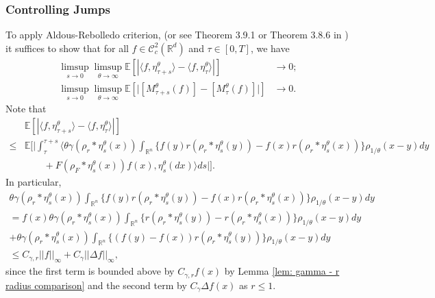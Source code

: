 \documentclass[12pt]{article}
\begin{document}
\subsubsection{Controlling Jumps}
To apply Aldous-Rebolledo criterion,
(or see Theorem 3.9.1 or Theorem 3.8.6 in \cite{EK})
it suffices to show that for all $f \in \mathcal{C}^2_{c}(\mathbb{R}^d)$
and $\tau \in [0,T]$, we have 
\begin{equation}
\begin{aligned}
\limsup_{s \to 0}\limsup_{\theta \to \infty}\mathbb{E}\left[\left| \langle f, \eta^{\theta}_{\tau+s}\rangle - \langle f, \eta^{\theta}_{\tau}\rangle \right|\right]& \to 0;\\
\limsup_{s \to 0}\limsup_{\theta \to \infty}\mathbb{E}\left[\big| [M^{\theta}_{\tau+s}(f)] - [M^{\theta}_{\tau}(f)] \big|\right]& \to 0.
\end{aligned}    
\end{equation}
Note that
\begin{equation}
\begin{aligned}
 & \mathbb{E}\left[\left| \langle f, \eta^{\theta}_{\tau+s}\rangle - \langle f, \eta^{\theta}_{\tau}\rangle \right|\right] \\
\leq & \mathbb{E}\Bigg[\bigg| \int_{\tau}^{\tau+s}\bigg\langle \theta\gamma(\rho_{r}*\eta^{\theta}_{s}(x)) \int_{\mathbb{R}^n} \big\{f(y)r(\rho_{r}*\eta^{\theta}_{s}(y))-f(x)r(\rho_{r}*\eta^{\theta}_{s}(x))\big\}\rho_{1/\theta}(x-y)dy \\
& \qquad + F(\rho_{F}*\eta^{\theta}_{s}(x)) f(x),\eta^{\theta}_{s}(dx)  \bigg\rangle ds \bigg|\Bigg].
\end{aligned}
\end{equation}
In particular,
\begin{multline}
 \theta\gamma(\rho_{r}*\eta^{\theta}_{s}(x))\int_{\mathbb{R}^n} \big\{f(y)r(\rho_{r}*\eta^{\theta}_{s}(y))-f(x)r(\rho_{r}*\eta^{\theta}_{s}(x))\big\}\rho_{1/\theta}(x-y)dy \\
 =  f(x)\theta\gamma(\rho_{r}*\eta^{\theta}_{s}(x))\int_{\mathbb{R}^n} \big\{r(\rho_{r}*\eta^{\theta}_{s}(y))-r(\rho_{r}*\eta^{\theta}_{s}(x))\big\}\rho_{1/\theta}(x-y)dy\\
 + \theta\gamma(\rho_{r}*\eta^{\theta}_{s}(x))\int_{\mathbb{R}^n} \big\{(f(y)-f(x))r(\rho_{r}*\eta^{\theta}_{s}(y))\big\}\rho_{1/\theta}(x-y)dy\\
 \leq C_{\gamma,r}||f||_{\infty} + C_{\gamma}||\Delta f||_{\infty},
\end{multline}
since the first term is bounded above by $C_{\gamma,r}f(x)$ by Lemma \ref{lem: gamma - r radius comparison}
and the second term by $C_{\gamma} \Delta f(x)$ as $r \leq 1$.
\end{document}
